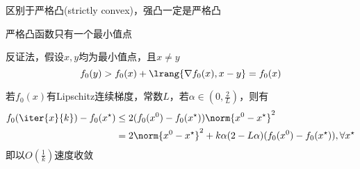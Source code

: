 区别于严格凸(strictly convex)，强凸一定是严格凸
\begin{theorem}
    严格凸函数只有一个最小值点
\end{theorem}
\begin{analysis}
    反证法，假设$x,y$均为最小值点，且$x\ne y$
    \[f_0(y)>f_0(x)+\lrang{\nabla f_0(x),x-y}=f_0(x)\]
\end{analysis}

\begin{theorem}
    若$f_0(x)$有Lipschitz连续梯度，常数$L$，若$\alpha\in(0,\frac{2}{L})$，则有
    \[\begin{aligned}
        f_0(\iter{x}{k})-f_0(x^\star)&\leq 2(f_0(x^0)-f_0(x^\star))\norm{x^0-x^\star}^2\\
        &=2\norm{x^0-x^\star}^2+k\alpha(2-L\alpha)(f_0(x^0)-f_0(x^\star)),\forall x^\star
    \end{aligned}\]
    即以$O(\frac{1}{k})$速度收敛
\end{theorem}
